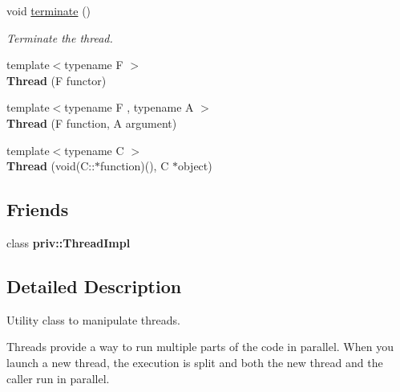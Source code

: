 \begin{DoxyCompactItemize}
void \hyperlink{classsf_1_1_thread_ad6b205d4f1ce38b8d44bba0f5501477c}{terminate} ()
\begin{DoxyCompactList}\small\item\em Terminate the thread. \end{DoxyCompactList}\item 
\mbox{\label{classsf_1_1_thread_a00b88f036de66eb63765f4c12ceb6870}} 
{\footnotesize template$<$typename F $>$ }\\{\bfseries Thread} (F functor)
\item 
\mbox{\label{classsf_1_1_thread_a719b2cc067d92d52c35064a49d850a53}} 
{\footnotesize template$<$typename F , typename A $>$ }\\{\bfseries Thread} (F function, A argument)
\item 
\mbox{\label{classsf_1_1_thread_aa9f473c8cbb078900c62b1fd14a83a34}} 
{\footnotesize template$<$typename C $>$ }\\{\bfseries Thread} (void(C\+::$\ast$function)(), C $\ast$object)
\end{DoxyCompactItemize}
\subsection*{Friends}
\begin{DoxyCompactItemize}
\item 
\mbox{\label{classsf_1_1_thread_a5ed4f3acfcb44de47de196437c39f9ef}} 
class {\bfseries priv\+::\+Thread\+Impl}
\end{DoxyCompactItemize}


\subsection{Detailed Description}
Utility class to manipulate threads. 

Threads provide a way to run multiple parts of the code in parallel. When you launch a new thread, the execution is split and both the new thread and the caller run in parallel.

